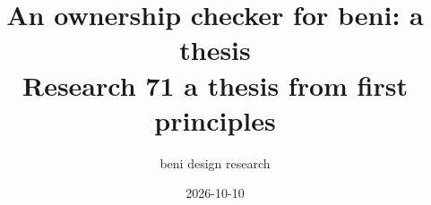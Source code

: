 \documentclass[11pt,a4paper]{article}
\title{An ownership checker for beni: a thesis\\[0.5em]\large Research 71 \textemdash{} a thesis from first principles}
\author{beni design research}
\date{2026-10-10}
\begin{document}
\maketitle

\begin{abstract}

\end{abstract}

\tableofcontents
\clearpage

















\end{document}

